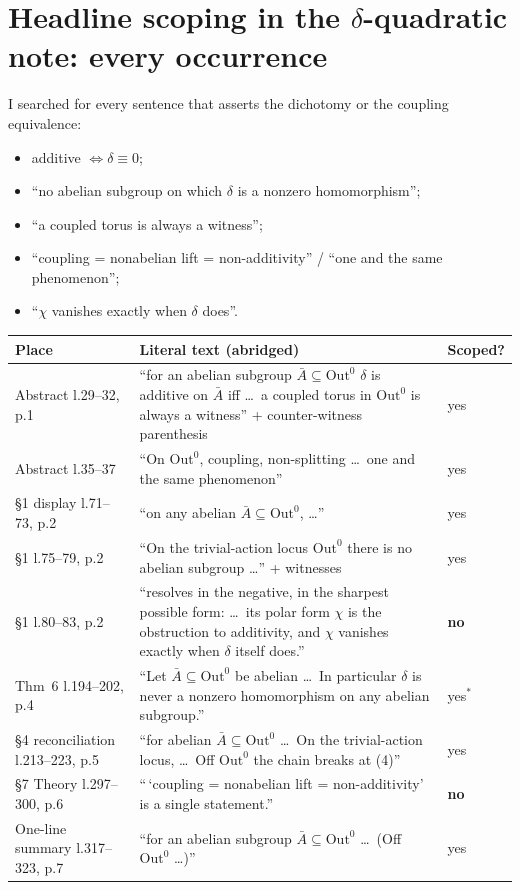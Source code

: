 \documentclass[10pt]{article}
\newcommand{\Out}{\mathrm{Out}}
\newcommand{\Abar}{\bar A}
\begin{document}
\section{Headline scoping in the $\delta$-quadratic note: every occurrence}
I searched for every sentence that asserts the dichotomy or the coupling equivalence:
\begin{itemize}
\item additive $\Leftrightarrow\delta\equiv0$;
\item ``no abelian subgroup on which $\delta$ is a nonzero homomorphism'';
\item ``a coupled torus is always a witness'';
\item ``coupling = nonabelian lift = non-additivity'' / ``one and the same phenomenon'';
\item ``$\chi$ vanishes exactly when $\delta$ does''.
\end{itemize}
\begin{center}\small
\begin{tabular}{>{\raggedright}p{3.2cm}p{9.3cm}l}
\toprule
Place & Literal text (abridged) & Scoped?\\
\midrule
Abstract l.29--32, p.1 & ``for an abelian subgroup $\Abar\subseteq\Out^0$ $\delta$ is additive on $\Abar$ iff \dots\ a coupled torus in $\Out^0$ is always a witness'' + counter-witness parenthesis & yes\\
Abstract l.35--37 & ``On $\Out^0$, coupling, non-splitting \dots\ one and the same phenomenon'' & yes\\
\S1 display l.71--73, p.2 & ``on any abelian $\Abar\subseteq\Out^0$, \dots'' & yes\\
\S1 l.75--79, p.2 & ``On the trivial-action locus $\Out^0$ there is no abelian subgroup \dots'' + witnesses & yes\\
\S1 l.80--83, p.2 & ``resolves in the negative, in the sharpest possible form: \dots\ its polar form $\chi$ is the obstruction to additivity, and $\chi$ vanishes exactly when $\delta$ itself does.'' & \textbf{no}\\
Thm~6 l.194--202, p.4 & ``Let $\Abar\subseteq\Out^0$ be abelian \dots\ In particular $\delta$ is never a nonzero homomorphism on any abelian subgroup.'' & yes$^\ast$\\
\S4 reconciliation l.213--223, p.5 & ``for abelian $\Abar\subseteq\Out^0$ \dots\ On the trivial-action locus, \dots\ Off $\Out^0$ the chain breaks at (4)'' & yes\\
\S7 Theory l.297--300, p.6 & ``\,`coupling = nonabelian lift = non-additivity' is a single statement.'' & \textbf{no}\\
One-line summary l.317--323, p.7 & ``for an abelian subgroup $\Abar\subseteq\Out^0$ \dots\ (Off $\Out^0$ \dots)'' & yes\\
\bottomrule
\end{tabular}
\end{center}
\end{document}
